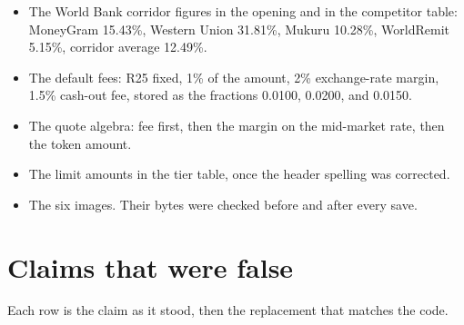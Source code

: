 \documentclass[11pt,a4paper]{article}
\begin{document}
\begin{itemize}
\item The World Bank corridor figures in the opening and in the competitor table: MoneyGram 15.43\%, Western Union 31.81\%, Mukuru 10.28\%, WorldRemit 5.15\%, corridor average 12.49\%.
\item The default fees: R25 fixed, 1\% of the amount, 2\% exchange-rate margin, 1.5\% cash-out fee, stored as the fractions 0.0100, 0.0200, and 0.0150.
\item The quote algebra: fee first, then the margin on the mid-market rate, then the token amount.
\item The limit amounts in the tier table, once the header spelling was corrected.
\item The six images. Their bytes were checked before and after every save.
\end{itemize}

\section{Claims that were false}

Each row is the claim as it stood, then the replacement that matches the code.
\end{document}
